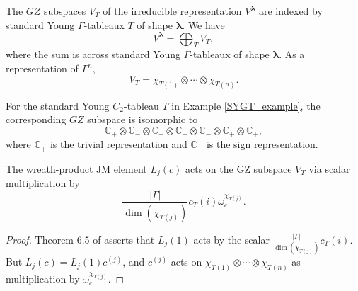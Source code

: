 \documentclass[ALCO,Unicode]{cedram}
\newcommand{\bs}{\boldsymbol}
\begin{document}
\begin{proposition}[{\cite[Section 4]{MS}}]
The $GZ$ subspaces $V_T$ of the irreducible representation $V^{\bs\lambda}$ are indexed by standard Young $\Gamma$-tableaux $T$ of shape $\bs\lambda$. We have
\[
V^{\bs\lambda} = \bigoplus_T V_T,
\]
where the sum is across standard Young $\Gamma$-tableaux of shape $\bs\lambda$. As a representation of $\Gamma^n$, \[
V_T = \chi_{T(1)} \otimes \cdots \otimes \chi_{T(n)}.
\]
\end{proposition}

\begin{example}
For the standard Young $C_2$-tableau $T$ in Example \ref{SYGT_example}, the corresponding $GZ$ subspace is isomorphic to
\[
\mathbb{C}_+ \otimes \mathbb{C}_- \otimes \mathbb{C}_+ \otimes \mathbb{C}_- \otimes \mathbb{C}_- \otimes \mathbb{C}_+ \otimes \mathbb{C}_+,
\]
where $\mathbb{C}_+$ is the trivial representation and $\mathbb{C}_-$ is the sign representation.
\end{example}

\begin{proposition} \label{wr_JM_eval_prop}
The wreath-product JM element $L_j(c)$ acts on the GZ subspace $V_T$ via scalar multiplication by
\[
\frac{|\Gamma|}{\dim(\chi_{T(j)})} c_T(i) \omega_c^{\chi_{T(j)}}.
\]
\end{proposition}
\begin{proof}
Theorem 6.5 of \cite{MS} asserts that $L_j(1)$ acts by the scalar $\frac{|\Gamma|}{\dim(\chi_{T(j)})} c_T(i)$. But $L_j(c) = L_j(1) c^{(j)}$, and $c^{(j)}$ acts on $\chi_{T(1)} \otimes \cdots \otimes \chi_{T(n)}$ as multiplication by $\omega_c^{\chi_{T(j)}}$.
\end{proof}
\end{document}
